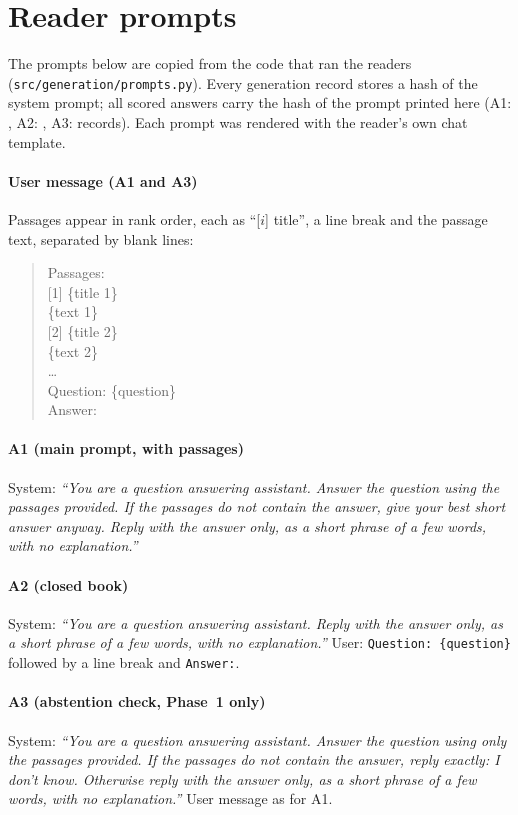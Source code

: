 \section{Reader prompts}\label{app:prompts}
The prompts below are copied from the code that ran the readers (\texttt{src/generation/prompts.py}). Every generation record stores a hash of the system prompt; all  scored answers carry the hash of the prompt printed here (A1: , A2: , A3:  records). Each prompt was rendered with the reader's own chat template.

\paragraph{User message (A1 and A3)} Passages appear in rank order, each as ``[$i$] title'', a line break and the passage text, separated by blank lines:
\begin{quote}\small\ttfamily
Passages:\\
{[}1{]} \{title 1\}\\
\{text 1\}\\[0.5ex]
{[}2{]} \{title 2\}\\
\{text 2\}\\
\ldots\\[0.5ex]
Question: \{question\}\\
Answer:
\end{quote}

\paragraph{A1 (main prompt, with passages)} System: \emph{``You are a question answering assistant. Answer the question using the passages provided. If the passages do not contain the answer, give your best short answer anyway. Reply with the answer only, as a short phrase of a few words, with no explanation.''}

\paragraph{A2 (closed book)} System: \emph{``You are a question answering assistant. Reply with the answer only, as a short phrase of a few words, with no explanation.''} User: \texttt{Question: \{question\}} followed by a line break and \texttt{Answer:}.

\paragraph{A3 (abstention check, Phase~1 only)} System: \emph{``You are a question answering assistant. Answer the question using only the passages provided. If the passages do not contain the answer, reply exactly: I don't know. Otherwise reply with the answer only, as a short phrase of a few words, with no explanation.''} User message as for A1.

